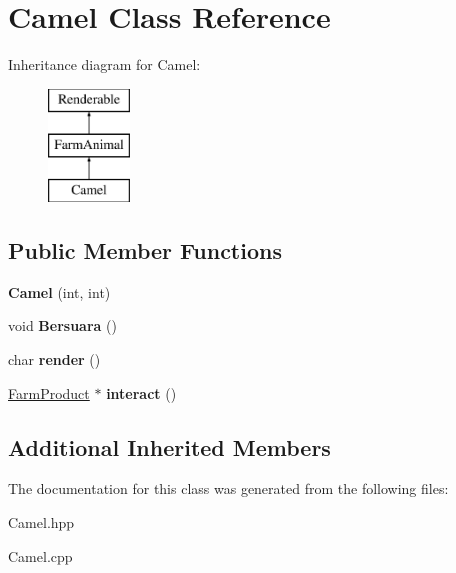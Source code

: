 \hypertarget{class_camel}{}\section{Camel Class Reference}
\label{class_camel}
Inheritance diagram for Camel\+:\begin{figure}[H]
\begin{center}
\leavevmode
\includegraphics[height=3.000000cm]{class_camel}
\end{center}
\end{figure}
\subsection*{Public Member Functions}
\begin{DoxyCompactItemize}
\item 
\mbox{\label{class_camel_a4f6e2857878ee23eb21dd50dac64d6fc}} 
{\bfseries Camel} (int, int)
\item 
\mbox{\label{class_camel_a7a1e8a70e336920283f9aa9e39374902}} 
void {\bfseries Bersuara} ()
\item 
\mbox{\label{class_camel_ae8b2448ea69d5dd31c8eddbc1f6c5e14}} 
char {\bfseries render} ()
\item 
\mbox{\label{class_camel_a6152cc6dfaec63816b0f750a18ebde0c}} 
\mbox{\hyperlink{class_farm_product}{Farm\+Product}} $\ast$ {\bfseries interact} ()
\end{DoxyCompactItemize}
\subsection*{Additional Inherited Members}


The documentation for this class was generated from the following files\+:\begin{DoxyCompactItemize}
\item 
Camel.\+hpp\item 
Camel.\+cpp\end{DoxyCompactItemize}

